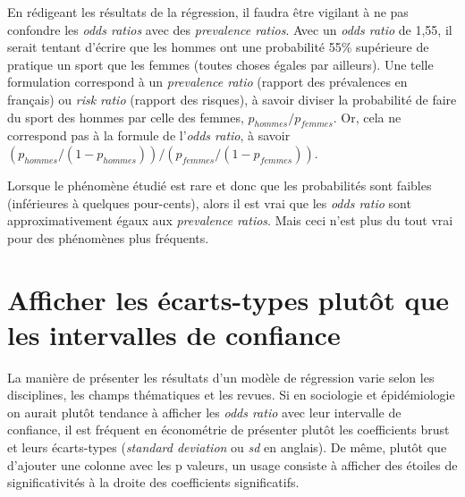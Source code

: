 \documentclass[
  letterpaper,
  DIV=11,
  numbers=noendperiod,
  oneside]{scrreprt}
\begin{document}
\begin{tcolorbox}[enhanced jigsaw, colbacktitle=quarto-callout-caution-color!10!white, opacityback=0, toprule=.15mm, colback=white, coltitle=black, bottomtitle=1mm, toptitle=1mm, titlerule=0mm, rightrule=.15mm, title=\textcolor{quarto-callout-caution-color}{\faFire}\hspace{0.5em}{Mise en garde}, breakable, bottomrule=.15mm, opacitybacktitle=0.6, arc=.35mm, left=2mm, leftrule=.75mm, colframe=quarto-callout-caution-color-frame]

En rédigeant les résultats de la régression, il faudra être vigilant à
ne pas confondre les \emph{odds ratios} avec des \emph{prevalence
ratios}. Avec un \emph{odds ratio} de 1,55, il serait tentant d'écrire
que les hommes ont une probabilité 55\% supérieure de pratique un sport
que les femmes (toutes choses égales par ailleurs). Une telle
formulation correspond à un \emph{prevalence ratio} (rapport des
prévalences en français) ou \emph{risk ratio} (rapport des risques), à
savoir diviser la probabilité de faire du sport des hommes par celle des
femmes, \(p_{hommes}/p_{femmes}\). Or, cela ne correspond pas à la
formule de l'\emph{odds ratio}, à savoir
\((p_{hommes}/(1-p_{hommes}))/(p_{femmes}/(1-p_{femmes}))\).

Lorsque le phénomène étudié est rare et donc que les probabilités sont
faibles (inférieures à quelques pour-cents), alors il est vrai que les
\emph{odds ratio} sont approximativement égaux aux \emph{prevalence
ratios}. Mais ceci n'est plus du tout vrai pour des phénomènes plus
fréquents.

\end{tcolorbox}

\hypertarget{afficher-les-uxe9carts-types-plutuxf4t-que-les-intervalles-de-confiance}{%
\section{Afficher les écarts-types plutôt que les intervalles de
confiance}\label{afficher-les-uxe9carts-types-plutuxf4t-que-les-intervalles-de-confiance}}

La manière de présenter les résultats d'un modèle de régression varie
selon les disciplines, les champs thématiques et les revues. Si en
sociologie et épidémiologie on aurait plutôt tendance à afficher les
\emph{odds ratio} avec leur intervalle de confiance, il est fréquent en
économétrie de présenter plutôt les coefficients brust et leurs
écarts-types (\emph{standard deviation} ou \emph{sd} en anglais). De
même, plutôt que d'ajouter une colonne avec les p valeurs, un usage
consiste à afficher des étoiles de significativités à la droite des
coefficients significatifs.
\end{document}
